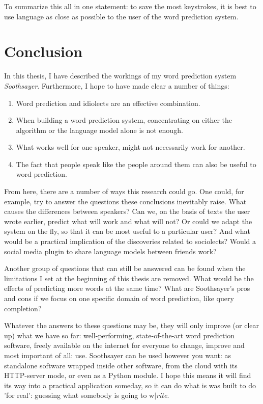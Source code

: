 \documentclass[11pt]{article}
\let\stdsection\section
\renewcommand\section{\newpage\stdsection}
\begin{document}
To summarize this all in one statement: to save the most keystrokes, it is best to use language as close as possible to the user of the word prediction system.










\section{Conclusion} \label{conclusion}
In this thesis, I have described the workings of my word prediction system \emph{Soothsayer}. Furthermore, I hope to have made clear a number of things:

\begin{enumerate}
\item Word prediction and idiolects are an effective combination.
\item When building a word prediction system, concentrating on either the algorithm or the language model alone is not enough.
\item What works well for one speaker, might not necessarily work for another.
\item The fact that people speak like the people around them can also be useful to word prediction.
\end{enumerate}

From here, there are a number of ways this research could go. One could, for example, try to answer the questions these conclusions inevitably raise. What causes the differences between speakers? Can we, on the basis of texts the user wrote earlier, predict what will work and what will not? Or could we adapt the system on the fly, so that it can be most useful to a particular user? And what would be a practical implication of the discoveries related to sociolects? Would a social media plugin to share language models between friends work? 

Another group of questions that can still be answered can be found when the limitations I set at the beginning of this thesis are removed. What would be the effects of predicting more words at the same time? What are Soothsayer's pros and cons if we focus on one specific domain of word prediction, like query completion?

Whatever the answers to these questions may be, they will only improve (or clear up) what we have so far: well-performing, state-of-the-art word prediction software, freely available on the internet for everyone to change, improve and most important of all: use. Soothsayer can be used however you want: as standalone software wrapped inside other software, from the cloud with its HTTP-server mode, or even as a Python module. I hope this means it will find its way into a practical application someday, so it can do what is was built to do 'for real': guessing what somebody is going to w$|$\emph{rite}.
\end{document}
